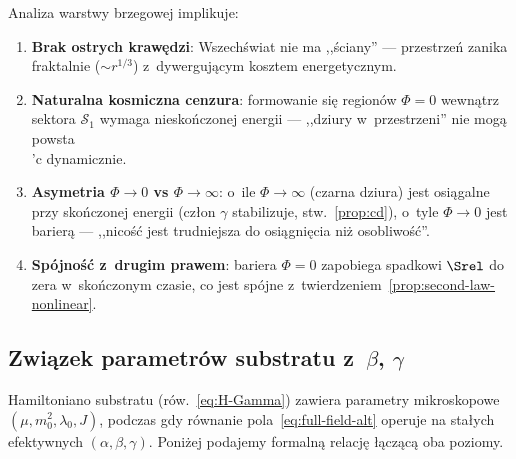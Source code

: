 \begin{remark}\label{rem:boundary-physics}
Analiza warstwy brzegowej implikuje:
\begin{enumerate}[nosep]
  \item \textbf{Brak ostrych kraw\k{e}dzi}: Wszech\'swiat nie
    ma ,,\'sciany'' --- przestrze\'n zanika fraktalnie
    ($\sim r^{1/3}$) z~dywerguj\k{a}cym kosztem energetycznym.
  \item \textbf{Naturalna kosmiczna cenzura}: formowanie
    si\k{e} region\'ow $\Phi = 0$ wewn\k{a}trz sektora
    $\mathcal{S}_1$ wymaga niesko\'nczonej energii ---
    ,,dziury w~przestrzeni'' nie mog\k{a} powsta\\'c
    dynamicznie.
  \item \textbf{Asymetria $\Phi \to 0$ vs $\Phi \to \infty$}:
    o~ile $\Phi \to \infty$ (czarna dziura) jest
    osi\k{a}galne przy sko\'nczonej energii (cz\l{}on $\gamma$
    stabilizuje, stw.~\ref{prop:cd}), o~tyle
    $\Phi \to 0$ jest barier\k{a} --- ,,nico\'s\'c jest
    trudniejsza do osi\k{a}gni\k{e}cia ni\.z osobliwo\'s\'c''.
  \item \textbf{Sp\'ojno\'s\'c z~drugim prawem}:
    bariera $\Phi = 0$ zapobiega spadkowi $\Srel$ do zera
    w~sko\'nczonym czasie, co jest sp\'ojne
    z~twierdzeniem~\ref{prop:second-law-nonlinear}.
\end{enumerate}
\end{remark}

\subsection{Zwi\k{a}zek parametr\'ow substratu z~$\beta$, $\gamma$}\label{ssec:substrat-param}

Hamiltoniano substratu (r\'ow.~\ref{eq:H-Gamma}) zawiera
parametry mikroskopowe $(\mu, m_0^2, \lambda_0, J)$, podczas
gdy r\'ownanie pola~\eqref{eq:full-field-alt} operuje na
sta\l{}ych efektywnych $(\alpha, \beta, \gamma)$.
Poni\.zej podajemy formaln\k{a} relacj\k{e} \l{}\k{a}cz\k{a}c\k{a}
oba poziomy.

